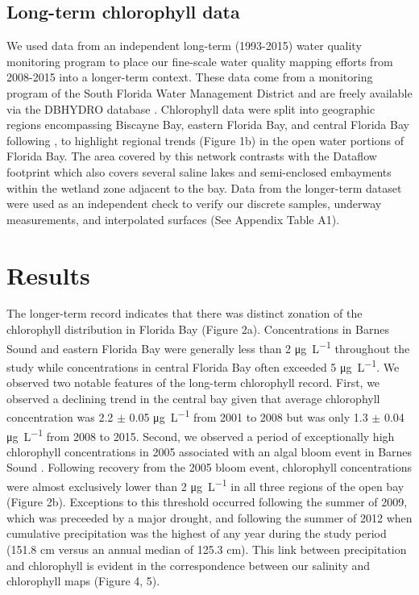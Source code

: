 \subsection{Long-term chlorophyll data}
\label{longtermchl}

We used data from an independent long-term (1993-2015) water quality monitoring program to place our fine-scale water quality mapping efforts from 2008-2015 into a longer-term context. These data come from a monitoring program of the South Florida Water Management District and are freely available via the DBHYDRO database \citep[\href{https://www.sfwmd.gov/science-data/dbhydro}{https://www.sfwmd.gov/science-data/dbhydro}; ][]{dbhydror}. Chlorophyll data were split into geographic regions encompassing Biscayne Bay, eastern Florida Bay, and central Florida Bay following \citet{boyer_seasonal_1999}, to highlight regional trends (Figure 1b) in the open water portions of Florida Bay. The area covered by this network contrasts with the Dataflow footprint which also covers several saline lakes and semi-enclosed embayments within the wetland zone adjacent to the bay. Data from the longer-term dataset were used as an independent check to verify our discrete samples, underway measurements, and interpolated surfaces (See Appendix Table A1).

\section{Results}
\label{results}

The longer-term record indicates that there was distinct zonation of the chlorophyll distribution in Florida Bay (Figure 2a). Concentrations in Barnes Sound and eastern Florida Bay were generally less than 2 \si{\micro\gram\per\liter} throughout the study while concentrations in central Florida Bay often exceeded 5 \si{\micro\gram\per\liter}. We observed two notable features of the long-term chlorophyll record. First, we observed a declining trend in the central bay given that average chlorophyll concentration was 2.2 $\pm$ 0.05 \si{\micro\gram\per\liter} from 2001 to 2008 but was only 1.3 $\pm$ 0.04 \si{\micro\gram\per\liter} from 2008 to 2015. Second, we observed a period of exceptionally high chlorophyll concentrations in 2005 associated with an algal bloom event in Barnes Sound \citep{rudnick_2006}. Following recovery from the 2005 bloom event, chlorophyll concentrations were almost exclusively lower than 2 \si{\micro\gram\per\liter} in all three regions of the open bay (Figure 2b). Exceptions to this threshold occurred following the summer of 2009, which was preceeded by a major drought, and following the summer of 2012 when cumulative precipitation was the highest of any year during the study period (151.8 cm versus an annual median of 125.3 cm). This link between precipitation and chlorophyll is evident in the correspondence between our salinity and chlorophyll maps (Figure 4, 5).  


